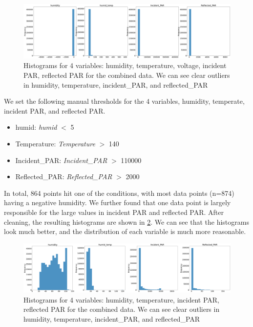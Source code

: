 \documentclass[11pt, letterpaper]{article}
\begin{document}
\begin{figure}[h!]
\centering
\includegraphics[width=1.0\textwidth]{Fig3_combined_hist.png}
\caption{Histograms for 4 variables: humidity, temperature, voltage, incident PAR, reflected PAR for the combined data. We can see clear outliers in humidity, temperature, incident\_PAR, and reflected\_PAR}
\label{fig3:combined_hist}
\end{figure}

We set the following manual thresholds for the 4  variables, humidity, temperate, incident PAR, and reflected PAR.

\begin{itemize}
    \item humid: \textit{humid} $<$ 5
    \item Temperature: \textit{Temperature} $>$  140
    \item Incident\_PAR: \textit{Incident\_PAR} $>$  110000
    \item Reflected\_PAR: \textit{Reflected\_PAR} $>$  2000
\end{itemize}
In total, 864 points hit one of the conditions, with most data points (n=874) having a negative humidity. We further found that one data point is largely responsible for the large values in incident PAR and reflected PAR. After cleaning, the resulting histograms are shown in \ref{fig3:combined_hist_after_clean}. We can see that the histograms look much better, and the distribution of each variable is much more reasonable.

\begin{figure}[h!]
\centering
\includegraphics[width=1.0\textwidth]{Fig4_combined_hist_after.png}
\caption{Histograms for 4 variables: humidity, temperature, incident PAR, reflected PAR for the combined data. We can see clear outliers in humidity, temperature, incident\_PAR, and reflected\_PAR}
\label{fig3:combined_hist_after_clean}
\end{figure}
\end{document}
